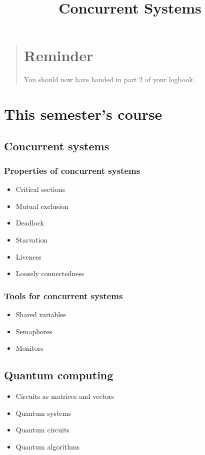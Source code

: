 \documentclass{article}
\title{Concurrent Systems}
\begin{document}
\maketitle
\tableofcontents

\begin{quote}
\section*{Reminder}
You should now have handed in part 2 of your logbook.
\end{quote}

\section{This semester's course}

\subsection{Concurrent systems}
\subsubsection{Properties of concurrent systems}

\begin{itemize}
\item Critical sections
\item Mutual exclusion
\item Deadlock
\item Starvation
\item Liveness
\item Loosely connectedness
\end{itemize}


\subsubsection{Tools for concurrent systems}

\begin{itemize}
\item Shared variables
\item Semaphores
\item Monitors
\end{itemize}


\subsection{Quantum computing}
\begin{itemize}
\item Circuits as matrices and vectors
\item Quantum systems
\item Quantum circuits
\item Quantum algorithms
\end{itemize}
\end{document}
